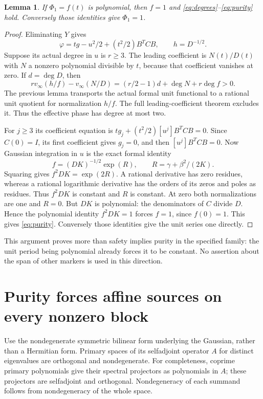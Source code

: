 \documentclass[11pt]{article}
\newtheorem{lemma}[theorem]{Lemma}
\theoremstyle{definition}\newtheorem{definition}[theorem]{Definition}
\theoremstyle{remark}\newtheorem{remark}[theorem]{Remark}
\begin{document}
\begin{lemma}\label{lem:polynomialunit}
If $\Phi_1=f(t)$ is polynomial, then $f=1$ and
\eqref{eq:degrees}--\eqref{eq:purity} hold. Conversely those
identities give $\Phi_1=1$.
\end{lemma}
\begin{proof}
Eliminating $Y$ gives
\[
 \varphi=tg-u^2/2+(t^2/2)B^TCB,\qquad h=D^{-1/2}.
\]
Suppose its actual degree in $u$ is $r\ge3$. The leading
coefficient is $N(t)/D(t)$ with $N$ a nonzero polynomial
divisible by $t$, because that coefficient vanishes at zero.
If $d=\deg D$, then
\[
 r v_\infty(h/f)-v_\infty(N/D)
  =(r/2-1)d+\deg N+r\deg f>0.
\]
The previous lemma transports the actual formal unit functional
to a rational unit quotient for normalization $h/f$. The full
leading-coefficient theorem excludes it. Thus the effective
phase has degree at most two.

For $j\ge3$ its coefficient equation is
$tg_j+(t^2/2)[u^j]B^TCB=0$. Since $C(0)=I$, its first
coefficient gives $g_j=0$, and then $[u^j]B^TCB=0$.
Now Gaussian integration in $u$ is the exact formal identity
\[
 f=(DK)^{-1/2}\exp(R),\qquad R=\gamma+\beta^2/(2K).
\]
Squaring gives $f^2DK=\exp(2R)$. A rational derivative has
zero residues, whereas a rational logarithmic derivative has
the orders of its zeros and poles as residues. Thus $f^2DK$
is constant and $R$ is constant. At zero both normalizations
are one and $R=0$. But $DK$ is polynomial: the denominators
of $C$ divide $D$. Hence the polynomial identity $f^2DK=1$
forces $f=1$, since $f(0)=1$. This gives \eqref{eq:purity}.
Conversely those identities give the unit series one directly.
\end{proof}

This argument proves more than safety implies purity in the
specified family: the unit period being polynomial already
forces it to be constant. No assertion about the span of other
markers is used in this direction.

\section{Purity forces affine sources on every nonzero block}

Use the nondegenerate symmetric bilinear form underlying the
Gaussian, rather than a Hermitian form. Primary spaces of its
selfadjoint operator $A$ for distinct eigenvalues are orthogonal
and nondegenerate. For completeness, coprime primary polynomials
give their spectral projectors as polynomials in $A$; these
projectors are selfadjoint and orthogonal. Nondegeneracy of each
summand follows from nondegeneracy of the whole space.
\end{document}
